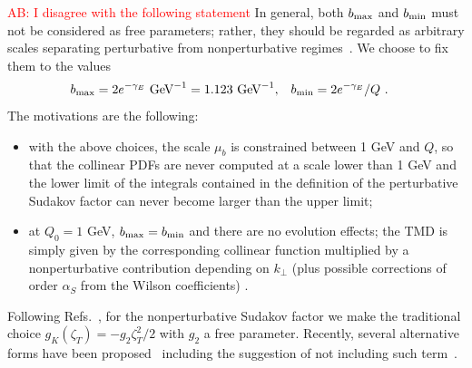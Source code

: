 \documentclass[aps,preprintnumbers,showpacs,nofootinbib,superscriptaddress,floatfix]{revtex4}
\newcommand{\T}{\perp}
\newcommand{\bT}{\zeta_T}
\begin{document}
\textcolor{red}{AB: I disagree with the following statement}
In general, both $b_{\rm max}$ and
$b_{\rm min}$ must not be considered as free parameters; rather, they should
be regarded as arbitrary scales separating perturbative from nonperturbative
regimes~\cite{Collins:2014jpa}. 
We choose to fix them to the
values 
\begin{align}
b_{\rm max} &= 2 e^{-\gamma_E}  \text{  GeV}^{-1} = 1.123 \text{  GeV}^{-1}, 
&
b_{\rm min} &= 2 e^{-\gamma_E}/Q \ .
\label{e:bminmax}
\end{align} 
The motivations are the following: 
\begin{itemize}
\item{} with the above choices, the scale $\mu_b$ is
  constrained between 1 GeV and $Q$, so that the collinear PDFs are never
  computed at a scale lower than 1 GeV and the lower limit of the integrals
  contained in the definition of the perturbative Sudakov factor can never
  become larger than the upper limit;
\item{} at $Q_0 = 1$ GeV, $b_{\rm max} = b_{\rm min}$ and there are no evolution effects; the TMD is
simply given by the corresponding collinear function multiplied by a
nonperturbative contribution depending on $k_\T$ (plus possible corrections of
order $\alpha_S$ from the Wilson coefficients) .
\end{itemize} 

Following Refs.~\cite{Nadolsky:1999kb,Landry:2002ix,Konychev:2005iy}, for the
nonperturbative Sudakov factor we make the traditional choice $g_K (\bT) = -
g_2 \bT^2 / 2$ with $g_2$ a free parameter. Recently, several alternative
forms have been proposed~\cite{Aidala:2014hva,Collins:2014jpa} including the
suggestion of not including such term~\cite{D'Alesio:2014vja}. 
\end{document}
